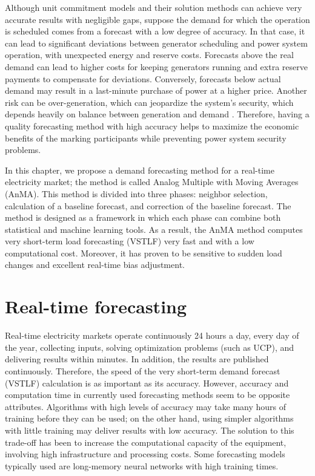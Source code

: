 Although unit commitment models and their solution methods can achieve very accurate results with negligible gaps, suppose the demand for which the operation is scheduled comes from a forecast with a low degree of accuracy. In that case, it can lead to significant deviations between generator scheduling and power system operation, with unexpected energy and reserve costs. Forecasts above the real demand can lead to higher costs for keeping generators running and extra reserve payments to compensate for deviations. Conversely, forecasts below actual demand may result in a last-minute purchase of power at a higher price. Another risk can be over-generation, which can jeopardize the system's security, which depends heavily on balance between generation and demand \citep{zuniga2019prediction}. Therefore, having a quality forecasting method with high accuracy helps to maximize the economic benefits of the marking participants while preventing power system security problems. 

In this chapter, we propose a demand forecasting method for a real-time electricity market; the method is called Analog Multiple with Moving Averages (AnMA).
This method is divided into three phases: neighbor selection, calculation of a baseline forecast, and correction of the baseline forecast. The method is designed as a framework in which each phase can combine both statistical and machine learning tools. As a result, the AnMA method computes very short-term load forecasting (VSTLF) very fast and with a low computational cost. Moreover, it has proven to be sensitive to sudden load changes and excellent real-time bias adjustment.

\section{Real-time forecasting}
Real-time electricity markets operate continuously 24 hours a day, every day of the year, collecting inputs, solving optimization problems (such as UCP), and delivering results within minutes. In addition, the results are published continuously. Therefore, the speed of the very short-term demand forecast (VSTLF) calculation is as important as its accuracy. However, accuracy and computation time in currently used forecasting methods seem to be opposite attributes. Algorithms with high levels of accuracy may take many hours of training before they can be used; on the other hand, using simpler algorithms with little training may deliver results with low accuracy. 
The solution to this trade-off has been to increase the computational capacity of the equipment, involving high infrastructure and processing costs. Some forecasting models typically used are long-memory neural networks with high training times.

